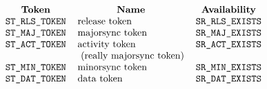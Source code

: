 
\[\begin{tabular}{rll}
    \multicolumn{1}{c}{\bf Token}&
		\multicolumn{1}{c}{\bf Name}&
			\multicolumn{1}{c}{\bf Availability}\\
    \tt ST\_RLS\_TOKEN&
		release token&
			\tt SR\_RLS\_EXISTS\\
    \tt ST\_MAJ\_TOKEN&
		majorsync token&
			\tt SR\_MAJ\_EXISTS\\
    \tt ST\_ACT\_TOKEN&
		activity token&
			\tt SR\_ACT\_EXISTS\\
    &
		\ (really majorsync token)&
			\\
    \tt ST\_MIN\_TOKEN&
		minorsync token&
			\tt SR\_MIN\_EXISTS\\
    \tt ST\_DAT\_TOKEN&
		data token&
			\tt SR\_DAT\_EXISTS
\end{tabular}\]
